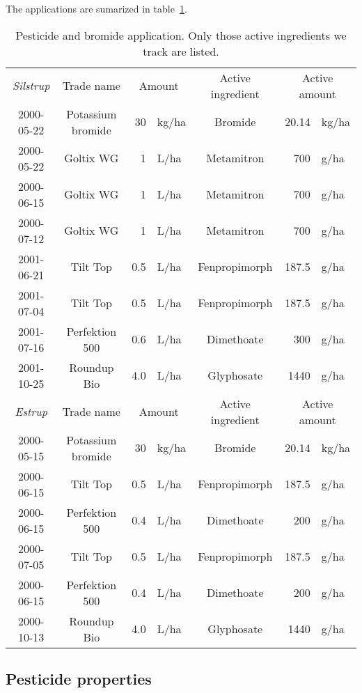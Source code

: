 \documentclass[a4paper]{article}
\begin{document}
\begin{text}
The applications are sumarized in table~\ref{tab:man-pest}.
\begin{table}[htbp]
  \caption{Pesticide and bromide application.  Only those active 
    ingredients we track are listed.  }
  \label{tab:man-pest}
  \centering
  \begin{tabular}{c|crl|crl}\hline
    \emph{Silstrup} & Trade name & \multicolumn{2}{c|}{Amount} 
               & Active ingredient & \multicolumn{2}{c}{Active amount} \\
    2000-05-22 & Potassium bromide & 30 & kg/ha & Bromide    & 20.14 & kg/ha\\
    2000-05-22 & Goltix WG      & 1   & L/ha & Metamitron    & 700   & g/ha\\
    2000-06-15 & Goltix WG      & 1   & L/ha & Metamitron    & 700   & g/ha\\
    2000-07-12 & Goltix WG      & 1   & L/ha & Metamitron    & 700   & g/ha\\
    2001-06-21 & Tilt Top       & 0.5 & L/ha & Fenpropimorph & 187.5 & g/ha\\
    2001-07-04 & Tilt Top       & 0.5 & L/ha & Fenpropimorph & 187.5 & g/ha\\
    2001-07-16 & Perfektion 500 & 0.6 & L/ha & Dimethoate    & 300   & g/ha\\
    2001-10-25 & Roundup Bio    & 4.0 & L/ha & Glyphosate    & 1440  & g/ha\\
    \hline
    \emph{Estrup} & Trade name & \multicolumn{2}{c|}{Amount} 
               & Active ingredient & \multicolumn{2}{c}{Active amount} \\
    2000-05-15 & Potassium bromide & 30 & kg/ha & Bromide & 20.14 & kg/ha\\
    2000-06-15 & Tilt Top       & 0.5 & L/ha & Fenpropimorph & 187.5 & g/ha\\
    2000-06-15 & Perfektion 500 & 0.4 & L/ha & Dimethoate    & 200   & g/ha\\
    2000-07-05 & Tilt Top       & 0.5 & L/ha & Fenpropimorph & 187.5 & g/ha\\
    2000-06-15 & Perfektion 500 & 0.4 & L/ha & Dimethoate    & 200   & g/ha\\
    2000-10-13 & Roundup Bio    & 4.0 & L/ha & Glyphosate    & 1440  & g/ha\\
  \end{tabular}
\end{table}

\subsection{Pesticide properties}


\end{text}
\end{document}
